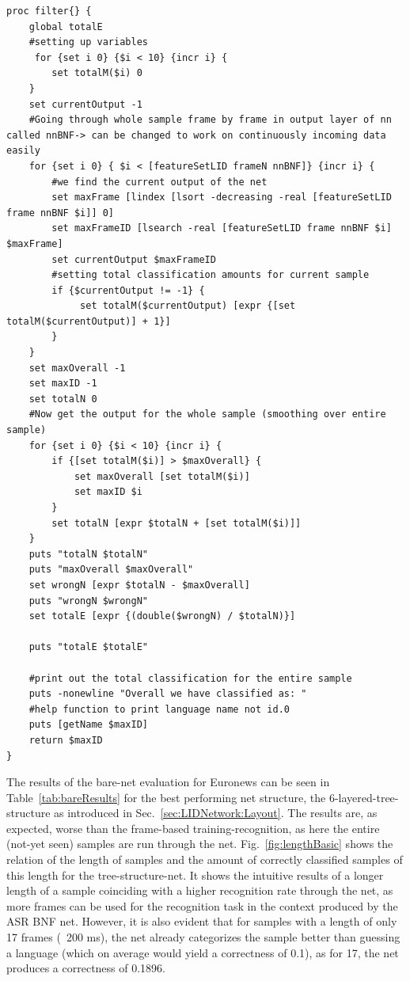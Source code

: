 \begin{lstlisting}[label=lst:basic,caption=Evaluation setup to count outputs per sample]
proc filter{} {
    global totalE
    #setting up variables
     for {set i 0} {$i < 10} {incr i} {
        set totalM($i) 0
    }
    set currentOutput -1
    #Going through whole sample frame by frame in output layer of nn called nnBNF-> can be changed to work on continuously incoming data easily
    for {set i 0} { $i < [featureSetLID frameN nnBNF]} {incr i} {
        #we find the current output of the net
        set maxFrame [lindex [lsort -decreasing -real [featureSetLID frame nnBNF $i]] 0]
        set maxFrameID [lsearch -real [featureSetLID frame nnBNF $i] $maxFrame]
        set currentOutput $maxFrameID
        #setting total classification amounts for current sample
        if {$currentOutput != -1} {
             set totalM($currentOutput) [expr {[set totalM($currentOutput)] + 1}]
        }
    }
    set maxOverall -1
    set maxID -1
    set totalN 0
    #Now get the output for the whole sample (smoothing over entire sample)
    for {set i 0} {$i < 10} {incr i} {
        if {[set totalM($i)] > $maxOverall} {
            set maxOverall [set totalM($i)]
            set maxID $i
        }
        set totalN [expr $totalN + [set totalM($i)]]
    }
    puts "totalN $totalN"
    puts "maxOverall $maxOverall"
    set wrongN [expr $totalN - $maxOverall]
    puts "wrongN $wrongN"
    set totalE [expr {(double($wrongN) / $totalN)}]

    puts "totalE $totalE"

    #print out the total classification for the entire sample
    puts -nonewline "Overall we have classified as: "
    #help function to print language name not id.0
    puts [getName $maxID]
    return $maxID
}
\end{lstlisting}


The results of the bare-net evaluation for Euronews can be seen in Table~\ref{tab:bareResults} for the best performing net structure, the 6-layered-tree-structure as introduced in Sec.~\ref{sec:LIDNetwork:Layout}. The results are, as expected, worse than the frame-based training-recognition, as here the entire (not-yet seen) samples are run through the net.  Fig.~\ref{fig:lengthBasic} shows the relation of the length of samples and the amount of correctly classified samples of this length for the tree-structure-net. It shows the intuitive results of a longer length of a sample coinciding with a higher recognition rate through the net, as more frames can be used for the recognition task in the context produced by the ASR BNF net. However, it is also evident that for samples with a length of only 17 frames (~200 ms), the net already categorizes the sample better than guessing a language (which on average would yield a correctness of 0.1), as for 17, the net produces a correctness of 0.1896.

